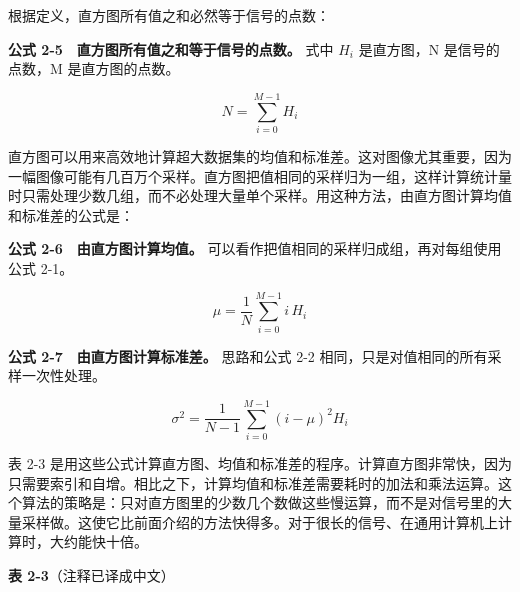 根据定义，直方图所有值之和必然等于信号的点数：

\textbf{公式 2-5　直方图所有值之和等于信号的点数。} 式中 \(H_i\)
是直方图，N 是信号的点数，M 是直方图的点数。

\[
N = \sum_{i=0}^{M-1} H_i
\]

直方图可以用来高效地计算超大数据集的均值和标准差。这对图像尤其重要，因为一幅图像可能有几百万个采样。直方图把值相同的采样归为一组，这样计算统计量时只需处理少数几组，而不必处理大量单个采样。用这种方法，由直方图计算均值和标准差的公式是：

\textbf{公式 2-6　由直方图计算均值。}
可以看作把值相同的采样归成组，再对每组使用公式 2-1。

\[
\mu = \frac{1}{N}\sum_{i=0}^{M-1} i\,H_i
\]

\textbf{公式 2-7　由直方图计算标准差。} 思路和公式 2-2
相同，只是对值相同的所有采样一次性处理。

\[
\sigma^2 = \frac{1}{N-1}\sum_{i=0}^{M-1} (i-\mu)^2 H_i
\]

表 2-3
是用这些公式计算直方图、均值和标准差的程序。计算直方图非常快，因为只需要索引和自增。相比之下，计算均值和标准差需要耗时的加法和乘法运算。这个算法的策略是：只对直方图里的少数几个数做这些慢运算，而不是对信号里的大量采样做。这使它比前面介绍的方法快得多。对于很长的信号、在通用计算机上计算时，大约能快十倍。

\textbf{表 2-3}（注释已译成中文）

